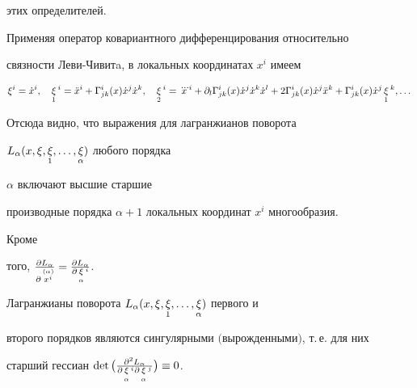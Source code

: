 этих определителей. 


Применяя оператор ковариантного дифференцирования относительно 


связности Леви-Чивитa, в локальных координатах $x^i$ имеем 


$$ 


\xi^i=\Dot x{}^i,\quad \mymath{\xi}_1{}^i=\Ddot x{}^i+ 


\Gamma^i_{jk}(x)\Dot x{}^j\Dot x{}^k,\quad 


\mymath{\xi}_2{}^i=\dddot x{}^i+\partial_l\Gamma^i_{jk}(x) 


\Dot x{}^j\Dot x{}^k\Dot x{}^l+2\Gamma^i_{jk}(x) 


\Dot x{}^j\Ddot x{}^k+\Gamma^i_{jk}(x) 


\Dot x{}^j\mymath{\xi}_1{}^k,\dotsc 


$$ 


Отсюда видно, что выражения для лагранжианов поворота 


$L_\alpha(x,\xi,\mathop{\xi}\limits_1,\dotsc,\mathop{\xi}\limits_\alpha)$ любого порядка 


$\alpha$ включают высшие старшие 


производные порядка $\alpha+1$ локальных координат $x^i$ многообразия. 


Кроме 


того, $\frac{\partial L_\alpha}{\partial\mymath{x^i}^{(\alpha)}}= 


\frac{\partial L_\alpha}{\partial\mymath{\xi}_\alpha{}^i}$. 


 


\begin{thm} 


Лагранжианы поворота $L_\alpha(x,\xi,\mymath{\xi}_1,\dotsc, 


\mymath{\xi}_\alpha)$ первого и 


второго порядков являются сингулярными $($вырожденными$)$, т.\,е. для них 


старший гессиан $\det\big(\frac{\partial^2L_\alpha} 


{\partial\mymath{\xi}_\alpha{}^i\partial\mymath{\xi}_\alpha{}^j} 


\big)\equiv0$. 


\end{thm} 


 


